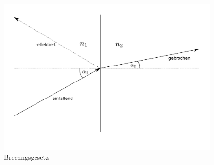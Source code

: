     \begin{figure}
        \centering
        \includegraphics{Geometrische_Optik/Protokoll/fig/Brechungsgesetz.png}
        \caption{Brechngsgesetz}
        \label{fig:Brechungsgesetz}
    \end{figure}
